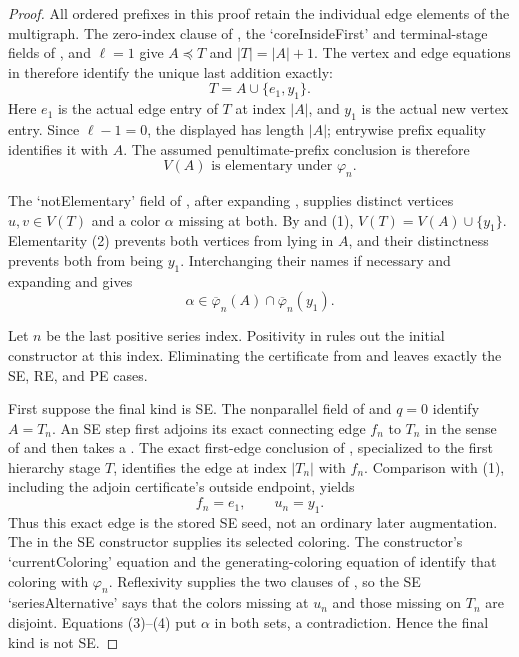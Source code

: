 \begin{proof}
All ordered prefixes in this proof retain the individual edge elements
of the multigraph.  The zero-index clause of
, the `coreInsideFirst' and
terminal-stage fields of , and
$\ell=1$ give $A\preccurlyeq T$ and $|T|=|A|+1$.
The vertex and edge equations in
 therefore identify the unique last
addition exactly:
\[
                     T=A\cup\{e_1,y_1\}.                     \tag{1}
\]
Here $e_1$ is the actual edge entry of $T$ at index $|A|$, and $y_1$
is the actual new vertex entry.  Since $\ell-1=0$, the displayed
 has length $|A|$; entrywise prefix equality
identifies it with $A$.  The assumed penultimate-prefix conclusion is
therefore
\[
              V(A)\text{ is elementary under }\varphi_n.     \tag{2}
\]

The `notElementary' field of
, after expanding
, supplies distinct vertices
$u,v\in V(T)$ and a color $\alpha$ missing at both.  By
 and (1),
$V(T)=V(A)\cup\{y_1\}$.  Elementarity (2) prevents both vertices from
lying in $A$, and their distinctness prevents both from being $y_1$.
Interchanging their names if necessary and expanding
 and  gives
\[
 \alpha\in\overline\varphi_n(A)
       \cap\overline\varphi_n(y_1).                           \tag{3}
\]

Let $n$ be the last positive series index.  Positivity in
 rules out the initial constructor at
this index.  Eliminating the certificate from
 and  leaves
exactly the SE, RE, and PE cases.

First suppose the final kind is SE.  The nonparallel field of
 and $q=0$ identify $A=T_n$.  An SE step first
adjoins its exact connecting edge $f_n$ to $T_n$ in the sense of
 and then takes a
.  The exact first-edge conclusion of
, specialized to the first
hierarchy stage $T$, identifies the edge at index $|T_n|$ with $f_n$.
Comparison with (1), including the adjoin certificate's outside
endpoint, yields
\[
                         f_n=e_1,\qquad u_n=y_1.               \tag{4}
\]
Thus this exact edge is the stored SE seed, not an ordinary later
augmentation.  The  in the SE
constructor supplies its selected coloring.  The constructor's
`currentColoring' equation and the generating-coloring equation of
 identify that coloring with
$\varphi_n$.  Reflexivity supplies the two clauses of
, so the SE `seriesAlternative' says that the
colors missing at $u_n$ and those missing on $T_n$ are disjoint.
Equations (3)--(4) put $\alpha$ in both sets, a contradiction.  Hence
the final kind is not SE.


\end{proof}
